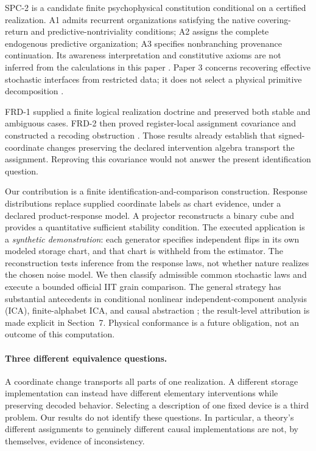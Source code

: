 \documentclass[11pt]{article}
\theoremstyle{definition}\newtheorem{definition}[theorem]{Definition}
\theoremstyle{remark}\newtheorem{remark}[theorem]{Remark}
\begin{document}
SPC-2 is a candidate finite psychophysical constitution conditional on a certified realization. A1 admits recurrent organizations satisfying the native covering-return and predictive-nontriviality conditions; A2 assigns the complete endogenous predictive organization; A3 specifies nonbranching provenance continuation. Its awareness interpretation and constitutive axioms are not inferred from the calculations in this paper \cite{mono,p2}. Paper 3 concerns recovering effective stochastic interfaces from restricted data; it does not select a physical primitive decomposition \cite{p3}.

FRD-1 supplied a finite logical realization doctrine and preserved both stable and ambiguous cases. FRD-2 then proved register-local assignment covariance and constructed a recoding obstruction \cite{frd1,frd2}. Those results already establish that signed-coordinate changes preserving the declared intervention algebra transport the assignment. Reproving this covariance would not answer the present identification question.

Our contribution is a finite identification-and-comparison construction. Response distributions replace supplied coordinate labels as chart evidence, under a declared product-response model. A projector reconstructs a binary cube and provides a quantitative sufficient stability condition. The executed application is a \emph{synthetic demonstration}: each generator specifies independent flips in its own modeled storage chart, and that chart is withheld from the estimator. The reconstruction tests inference from the response laws, not whether nature realizes the chosen noise model. We then classify admissible common stochastic laws and execute a bounded official IIT grain comparison. The general strategy has substantial antecedents in conditional nonlinear independent-component analysis (ICA), finite-alphabet ICA, and causal abstraction \cite{hyvarinen,khemakhem,yeredor,painsky,rubenstein,beckers}; the result-level attribution is made explicit in Section~7. Physical conformance is a future obligation, not an outcome of this computation.

\paragraph{Three different equivalence questions.}
A coordinate change transports all parts of one realization. A different storage implementation can instead have different elementary interventions while preserving decoded behavior. Selecting a description of one fixed device is a third problem. Our results do not identify these questions. In particular, a theory's different assignments to genuinely different causal implementations are not, by themselves, evidence of inconsistency.
\end{document}
